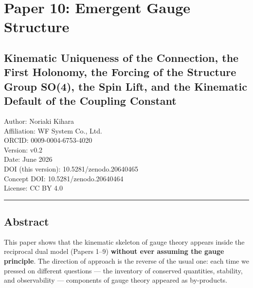 \documentclass[
]{article}
\author{}
\date{}
\begin{document}
\section{Paper 10: Emergent Gauge
Structure}\label{paper-10-emergent-gauge-structure}

\subsection{Kinematic Uniqueness of the Connection, the First Holonomy,
the Forcing of the Structure Group SO(4), the Spin Lift, and the
Kinematic Default of the Coupling
Constant}\label{kinematic-uniqueness-of-the-connection-the-first-holonomy-the-forcing-of-the-structure-group-so4-the-spin-lift-and-the-kinematic-default-of-the-coupling-constant}

Author: Noriaki Kihara\\
Affiliation: WF System Co., Ltd.\\
ORCID: 0009-0004-6753-4020\\
Version: v0.2\\
Date: June 2026\\
DOI (this version): 10.5281/zenodo.20640465\\
Concept DOI: 10.5281/zenodo.20640464\\
License: CC BY 4.0

\begin{center}\rule{0.5\linewidth}{0.5pt}\end{center}

\subsection{Abstract}\label{abstract}

This paper shows that the kinematic skeleton of gauge theory appears
inside the reciprocal dual model (Papers 1--9) \textbf{without ever
assuming the gauge principle}. The direction of approach is the reverse
of the usual one: each time we pressed on different questions --- the
inventory of conserved quantities, stability, and observability ---
components of gauge theory appeared as by-products.
\end{document}
